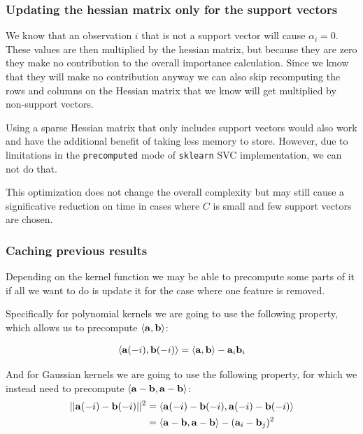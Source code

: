 \subsubsection*{Updating the hessian matrix only for the support vectors}

We know that an observation $i$ that is not a support vector will cause $\alpha_i = 0$. These values are then multiplied by the hessian matrix, but because they are zero they make no contribution to the overall importance calculation. Since we know that they will make no contribution anyway we can also skip recomputing the rows and columns on the Hessian matrix that we know will get multiplied by non-support vectors.

Using a sparse Hessian matrix that only includes support vectors would also work and have the additional benefit of taking less memory to store. However, due to limitations in the \texttt{precomputed} mode of \texttt{sklearn} SVC implementation, we can not do that.

This optimization does not change the overall complexity but may still cause a sig\-ni\-fica\-tive reduction on time in cases where $C$ is small and few support vectors are chosen.

\subsubsection*{Caching previous results}

Depending on the kernel function we may be able to precompute some parts of it if all we want to do is update it for the case where one feature is removed.

Specifically for polynomial kernels we are going to use the following property, which allows us to precompute $\langle\mathbf{a}, \mathbf{b}\rangle$:

\begin{align*}
    \langle\mathbf{a}(-i), \mathbf{b}(-i)\rangle &= \langle\mathbf{a}, \mathbf{b}\rangle - \mathbf{a}_i \mathbf{b}_i\\
\end{align*}

And for Gaussian kernels we are going to use the following property, for which we instead need to precompute $\langle\mathbf{a} - \mathbf{b}, \mathbf{a} - \mathbf{b}\rangle$:
\begin{align*}
    ||\mathbf{a}(-i) - \mathbf{b}(-i)||^2 &= \langle\mathbf{a}(-i) - \mathbf{b}(-i), \mathbf{a}(-i) - \mathbf{b}(-i)\rangle \\
    &= \langle\mathbf{a} - \mathbf{b}, \mathbf{a} - \mathbf{b}\rangle - (\mathbf{a}_i - \mathbf{b}_j )^2
\end{align*}


